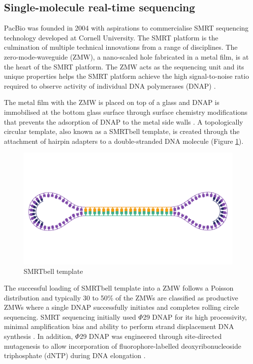 \subsection{Single-molecule real-time sequencing}

PacBio was founded in 2004 with aspirations to commercialise SMRT sequencing technology developed at Cornell University. The SMRT platform is the culmination of multiple technical innovations from a range of disciplines. The zero-mode-waveguide (ZMW), a nano-scaled hole fabricated in a metal film, is at the heart of the SMRT platform. The ZMW acts as the sequencing unit and its unique properties helps the SMRT platform achieve the high signal-to-noise ratio required to observe activity of individual DNA polymerases (DNAP) \cite{Levene2003-og}. 

The metal film with the ZMW is placed on top of a glass and DNAP is immobilised at the bottom glass surface through surface chemistry modifications that prevents the adsorption of DNAP to the metal side walls \cite{Korlach2008-aq, Eid2009-ol}. A topologically circular template, also known as a SMRTbell template, is created through the attachment of hairpin adapters to a double-stranded DNA molecule (Figure \ref{figure:smrtbell-template}).

\begin{figure}[htbp!]
\caption{SMRTbell template}
\label{figure:smrtbell-template}
\begin{centering}
\includegraphics[width=\textwidth]{Vector/SMRTbell_template.pdf}
\end{centering}
\end{figure}

The successful loading of SMRTbell template into a ZMW follows a Poisson distribution and typically 30 to 50\% of the ZMWs are classified as productive ZMWs where a single DNAP successfully initiates and completes rolling circle sequencing. SMRT sequencing initially used $\Phi$29 DNAP for its high processivity, minimal amplification bias and ability to perform strand displacement DNA synthesis \cite{Eid2009-ol}. In addition, $\Phi$29 DNAP was engineered through site-directed mutagenesis to allow incorporation of fluorophore-labelled deoxyribonucleoside triphosphate (dNTP) during DNA elongation \cite{Korlach2008-fv, Eid2009-ol}. 

